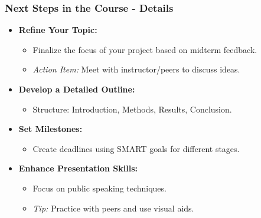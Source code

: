 \documentclass{beamer}
\begin{document}
\begin{frame}[fragile]
    \frametitle{Next Steps in the Course - Details}
    \begin{itemize}
        \item \textbf{Refine Your Topic:}
          \begin{itemize}
              \item Finalize the focus of your project based on midterm feedback.
              \item \textit{Action Item:} Meet with instructor/peers to discuss ideas.
          \end{itemize}
          
        \item \textbf{Develop a Detailed Outline:}
          \begin{itemize}
              \item Structure: Introduction, Methods, Results, Conclusion.
          \end{itemize}
          
        \item \textbf{Set Milestones:}
          \begin{itemize}
              \item Create deadlines using SMART goals for different stages.
          \end{itemize}
          
        \item \textbf{Enhance Presentation Skills:}
          \begin{itemize}
              \item Focus on public speaking techniques.
              \item \textit{Tip:} Practice with peers and use visual aids.
          \end{itemize}
    \end{itemize}
\end{frame}
\end{document}
